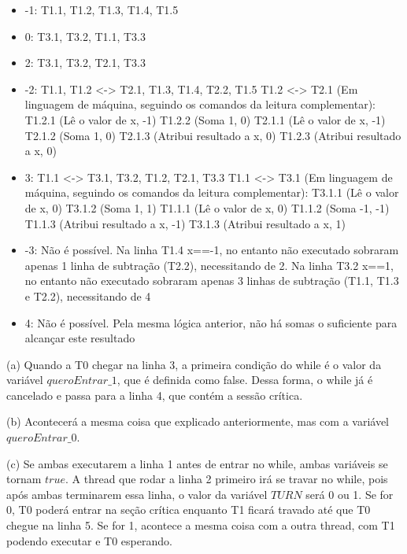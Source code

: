 \documentclass{homework}
\begin{document}
\exercise*
\begin{itemize}
    \item -1: T1.1, T1.2, T1.3, T1.4, T1.5
    \item 0: T3.1, T3.2, T1.1, T3.3
    \item 2: T3.1, T3.2, T2.1, T3.3
    \item -2: T1.1, T1.2 <-> T2.1, T1.3, T1.4, T2.2, T1.5
    \subitem T1.2 <-> T2.1 (Em linguagem de máquina, seguindo os comandos da leitura complementar):
    \subsubitem T1.2.1 (Lê o valor de x, -1)
    \subsubitem T1.2.2 (Soma 1, 0)
    \subsubitem T2.1.1 (Lê o valor de x, -1)
    \subsubitem T2.1.2 (Soma 1, 0)
    \subsubitem T2.1.3 (Atribui resultado a x, 0)
    \subsubitem T1.2.3 (Atribui resultado a x, 0)
    \item 3: T1.1 <-> T3.1, T3.2, T1.2, T2.1, T3.3
    \subitem T1.1 <-> T3.1 (Em linguagem de máquina, seguindo os comandos da leitura complementar):
    \subsubitem T3.1.1 (Lê o valor de x, 0)
    \subsubitem T3.1.2 (Soma 1, 1)
    \subsubitem T1.1.1 (Lê o valor de x, 0)
    \subsubitem T1.1.2 (Soma -1, -1)
    \subsubitem T1.1.3 (Atribui resultado a x, -1)
    \subsubitem T3.1.3 (Atribui resultado a x, 1)
    \item -3: Não é possível. Na linha T1.4 x==-1, no entanto não executado sobraram apenas 1 linha de subtração (T2.2), necessitando de 2. Na linha T3.2 x==1, no entanto não executado sobraram apenas 3 linhas de subtração (T1.1, T1.3 e T2.2), necessitando de 4
    \item 4: Não é possível. Pela mesma lógica anterior, não há somas o suficiente para alcançar este resultado
\end{itemize}

\exercise*

(a) Quando a T0 chegar na linha 3, a primeira condição do while é o valor da variável $queroEntrar\_1$, que é definida como false. Dessa forma, o while já é cancelado e passa para a linha 4, que contém a sessão crítica.

(b) Acontecerá a mesma coisa que explicado anteriormente, mas com a variável $queroEntrar\_0$.

(c) Se ambas executarem a linha 1 antes de entrar no while, ambas variáveis se tornam $true$. A thread que rodar a linha 2 primeiro irá se travar no while, pois após ambas terminarem essa linha, o valor da variável $TURN$ será 0 ou 1. Se for 0, T0 poderá entrar na seção crítica enquanto T1 ficará travado até que T0 chegue na linha 5. Se for 1, acontece a mesma coisa com a outra thread, com T1 podendo executar e T0 esperando.
\end{document}
